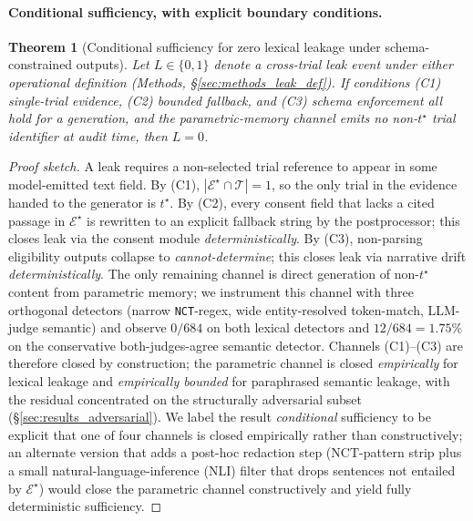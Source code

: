 \documentclass[11pt]{article}
\newtheorem{theorem}{Theorem}
\begin{document}
\paragraph{Conditional sufficiency, with explicit boundary conditions.}
\begin{theorem}[Conditional sufficiency for zero lexical leakage under schema-constrained outputs]
\label{thm:safety}
Let $L \in \{0, 1\}$ denote a cross-trial leak event under either operational definition (Methods, \S\ref{sec:methods_leak_def}). If conditions {\rm(C1) single-trial evidence}, {\rm(C2) bounded fallback}, and {\rm(C3) schema enforcement} all hold for a generation, and the parametric-memory channel emits no non-$t^\star$ trial identifier at audit time, then $L = 0$.
\end{theorem}
\begin{proof}[Proof sketch]
A leak requires a non-selected trial reference to appear in some model-emitted text field. By (C1), $|\mathcal{E}^\star \cap \mathcal{T}| = 1$, so the only trial in the evidence handed to the generator is $t^\star$. By (C2), every consent field that lacks a cited passage in $\mathcal{E}^\star$ is rewritten to an explicit fallback string by the postprocessor; this closes leak via the consent module \emph{deterministically}. By (C3), non-parsing eligibility outputs collapse to \emph{cannot-determine}; this closes leak via narrative drift \emph{deterministically}. The only remaining channel is direct generation of non-$t^\star$ content from parametric memory; we instrument this channel with three orthogonal detectors (narrow \texttt{NCT}-regex, wide entity-resolved token-match, LLM-judge semantic) and observe $0/684$ on both lexical detectors and $12/684 = 1.75\%$ on the conservative both-judges-agree semantic detector. Channels (C1)--(C3) are therefore closed by construction; the parametric channel is closed \emph{empirically} for lexical leakage and \emph{empirically bounded} for paraphrased semantic leakage, with the residual concentrated on the structurally adversarial subset (\S\ref{sec:results_adversarial}). We label the result \emph{conditional} sufficiency to be explicit that one of four channels is closed empirically rather than constructively; an alternate version that adds a post-hoc redaction step (NCT-pattern strip plus a small natural-language-inference (NLI) filter that drops sentences not entailed by $\mathcal{E}^\star$) would close the parametric channel constructively and yield fully deterministic sufficiency.
\end{proof}
\end{document}
